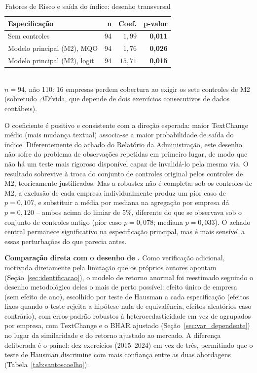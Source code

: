 \documentclass[a4paper,12pt]{report}
\begin{document}
\begin{table}[htbp]
    \centering
    \caption{Fatores de Risco e saída do índice: desenho transversal}
    \label{tab:riskfactors}
    \begin{tabular}{@{}p{6.5cm}rrr@{}}
        \toprule
        \textbf{Especificação} & \textbf{n} & \textbf{Coef.} & \textbf{p-valor} \\
        \midrule
        Sem controles                              & 94 & $1{,}99$ & \textbf{0,011} \\
        Modelo principal (M2), MQO                  & 94 & $1{,}76$ & \textbf{0,026} \\
        Modelo principal (M2), logit                & 94 & $15{,}71$ & \textbf{0,015} \\
        \bottomrule
    \end{tabular}
    \\[0.3cm]
    {\footnotesize $n=94$, não 110: 16 empresas perdem cobertura ao exigir os sete controles de M2 (sobretudo $\Delta$Dívida, que depende de dois exercícios consecutivos de dados contábeis).}
\end{table}

O coeficiente é positivo e consistente com a direção esperada: maior TextChange médio (mais mudança textual) associa-se a maior probabilidade de saída do índice. Diferentemente do achado do Relatório da Administração, este desenho não sofre do problema de observações repetidas em primeiro lugar, de modo que não há um teste mais rigoroso disponível capaz de invalidá-lo pela mesma via. O resultado sobrevive à troca do conjunto de controles original pelos controles de M2, teoricamente justificados. Mas a robustez não é completa: sob os controles de M2, a exclusão de cada empresa individualmente produz um pior caso de $p=0{,}107$, e substituir a média por mediana na agregação por empresa dá $p=0{,}120$ -- ambos acima do limiar de 5\%, diferente do que se observava sob o conjunto de controles antigo (pior caso $p=0{,}078$; mediana $p=0{,}033$). O achado central permanece significativo na especificação principal, mas é mais sensível a essas perturbações do que parecia antes.

\textbf{Comparação direta com o desenho de .} Como verificação adicional, motivada diretamente pela limitação que os próprios autores apontam (Seção~\ref{sec:identificacao}), o modelo de retorno anormal foi reestimado seguindo o desenho metodológico deles o mais de perto possível: efeito único de empresa (sem efeito de ano), escolhido por teste de Hausman a cada especificação (efeitos fixos quando o teste rejeita a hipótese nula de equivalência, efeitos aleatórios caso contrário), com erros-padrão robustos à heterocedasticidade em vez de agrupados por empresa, com TextChange e o BHAR ajustado (Seção~\ref{sec:var_dependente}) no lugar da similaridade e do retorno ajustado ao mercado. A diferença deliberada é o painel: dez exercícios (2015--2024) em vez de três, permitindo que o teste de Hausman discrimine com mais confiança entre as duas abordagens (Tabela~\ref{tab:santoscoelho}).
\end{document}
